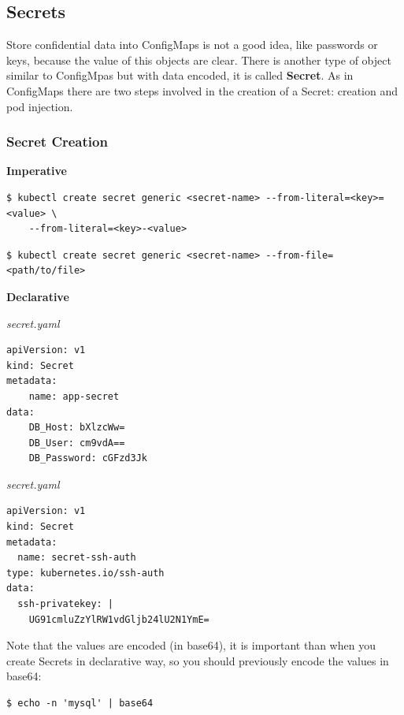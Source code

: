 \documentclass{article}
\newenvironment{blocktemplateIII}[1]{%
    \tcolorbox[beamer,%
    noparskip,breakable,
    ,colframe=Red,%
    colbacklower=LimeGreen!75!LightGreen,%
    title=#1]}%
    {\endtcolorbox}
\newenvironment{codetemplate}[1][]{%
  \mybasecolorbox[#1]
  \itshape
}{%
  \endmybasecolorbox
}
\begin{document}
\subsection{Secrets}
Store confidential data into ConfigMaps is not a good idea, like passwords or keys, because the value of this objects are clear. There is another type of object similar to ConfigMpas but with data encoded, it is called \textbf{Secret}. As in ConfigMaps there are two steps involved in the creation of a Secret: creation and pod injection.
\subsubsection{Secret Creation}

\textbf{Imperative}
\begin{codetemplate}{}
\begin{verbatim}
$ kubectl create secret generic <secret-name> --from-literal=<key>=<value> \
    --from-literal=<key>-<value>
\end{verbatim}
\end{codetemplate}

\begin{codetemplate}{}
\begin{verbatim}
$ kubectl create secret generic <secret-name> --from-file=<path/to/file>
\end{verbatim}
\end{codetemplate}

\textbf{Declarative}

\begin{codetemplate}{secret.yaml}
\begin{verbatim}
apiVersion: v1
kind: Secret
metadata:
    name: app-secret
data:
    DB_Host: bXlzcWw=
    DB_User: cm9vdA==
    DB_Password: cGFzd3Jk
\end{verbatim}
\end{codetemplate}

\begin{codetemplate}{secret.yaml}
\begin{verbatim}
apiVersion: v1
kind: Secret
metadata:
  name: secret-ssh-auth
type: kubernetes.io/ssh-auth
data:
  ssh-privatekey: |
    UG91cmluZzYlRW1vdGljb24lU2N1YmE=    
\end{verbatim}
\end{codetemplate}

\begin{blocktemplateIII}{WARNING}
Note that the values are encoded (in base64), it is important than when you create Secrets in declarative way, so you should previously encode the values in base64:
\begin{codetemplate}{}
\begin{verbatim}
$ echo -n 'mysql' | base64
\end{verbatim}
\end{codetemplate}
\end{blocktemplateIII}
\end{document}
